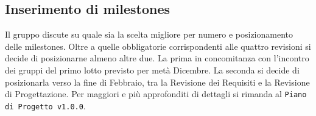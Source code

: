 \documentclass[a4paper,12pt]{article}
\begin{document}
	\subsection{Inserimento di milestones}
	Il gruppo discute su quale sia la scelta migliore per numero e posizionamento delle milestones. Oltre a quelle obbligatorie corrispondenti alle quattro revisioni si decide di posizionarne almeno altre due. La prima in concomitanza con l'incontro dei gruppi del primo lotto previsto per metà Dicembre. La seconda si decide di posizionarla verso la fine di Febbraio, tra la Revisione dei Requisiti e la Revisione di Progettazione. Per maggiori e più approfonditi di dettagli si rimanda al \texttt{Piano di Progetto v1.0.0}.
\end{document}
